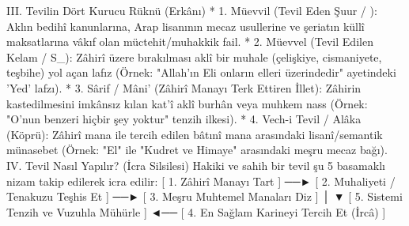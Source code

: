 \documentclass[11pt,a4paper]{article}
\begin{document}
III. Tevilin Dört Kurucu Rüknü (Erkânı)
 * 1. Müevvil (Tevil Eden Şuur / ): Aklın bedihî kanunlarına, Arap lisanının mecaz usullerine ve şeriatın küllî maksatlarına vâkıf olan müctehit/muhakkik fail.
 * 2. Müevvel (Tevil Edilen Kelam / S_{}): Zâhirî üzere bırakılması aklî bir muhale (çelişkiye, cismaniyete, teşbihe) yol açan lafız (Örnek: "Allah'ın Eli onların elleri üzerindedir" ayetindeki 'Yed' lafzı).
 * 3. Sârif / Mâni' (Zâhirî Manayı Terk Ettiren İllet): Zâhirin kastedilmesini imkânsız kılan kat'î aklî burhân veya muhkem nass (Örnek: "O'nun benzeri hiçbir şey yoktur" tenzih ilkesi).
 * 4. Vech-i Tevil / Alâka (Köprü): Zâhirî mana ile tercih edilen bâtınî mana arasındaki lisanî/semantik münasebet (Örnek: "El" ile "Kudret ve Himaye" arasındaki meşru mecaz bağı).
IV. Tevil Nasıl Yapılır? (İcra Silsilesi)
Hakiki ve sahih bir tevil şu 5 basamaklı nizam takip edilerek icra edilir:
[ 1. Zâhirî Manayı Tart ] ──► [ 2. Muhaliyeti / Tenakuzu Teşhis Et ] ──► [ 3. Meşru Muhtemel Manaları Diz ]
                                                                                   │
                                                                                   ▼
[ 5. Sistemi Tenzih ve Vuzuhla Mühürle ] ◄── [ 4. En Sağlam Karineyi Tercih Et (İrcâ) ]
\end{document}
